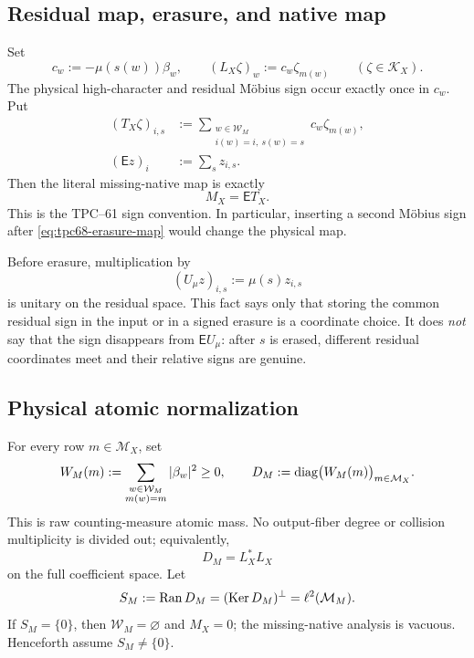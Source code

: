 \subsection{Residual map, erasure, and native map}

Set
\begin{equation}
 c_w:=-\mu(s(w))\beta_w,
 \qquad
 (L_X\zeta)_w:=c_w\zeta_{m(w)}
 \qquad(\zeta\in\mathcal K_X).
 \label{eq:tpc68-atomic-lift}
\end{equation}
The physical high-character and residual M\"obius sign occur exactly once
in \(c_w\).  Put
\begin{align}
 (T_X\zeta)_{i,s}
 &:=
 \sum_{\substack{w\in\mathcal W_M\\
                 i(w)=i,\ s(w)=s}}
 c_w\zeta_{m(w)},
 \label{eq:tpc68-residual-map}\\
 (\mathsf Ez)_i&:=\sum_s z_{i,s}.
 \label{eq:tpc68-erasure-map}
\end{align}
Then the literal missing-native map is exactly
\begin{equation}
 \boxed{M_X=\mathsf E T_X.}
 \label{eq:tpc68-missing-native-factorization}
\end{equation}
This is the TPC--61 sign convention.  In particular, inserting a second
M\"obius sign after \eqref{eq:tpc68-erasure-map} would change the physical
map.

Before erasure, multiplication by
\[
 (U_\mu z)_{i,s}:=\mu(s)z_{i,s}
\]
is unitary on the residual space.  This fact says only that storing the
common residual sign in the input or in a signed erasure is a coordinate
choice.  It does \emph{not} say that the sign disappears from
\(\mathsf EU_\mu\): after \(s\) is erased, different residual coordinates
meet and their relative signs are genuine.

\subsection{Physical atomic normalization}

For every row \(m\in\mathcal M_X\), set
\begin{equation}
 W_M(m)
 :=
 \sum_{\substack{w\in\mathcal W_M\\m(w)=m}}|\beta_w|^2\ge0,
 \qquad
 D_M:=\operatorname{diag}\bigl(W_M(m)\bigr)_{m\in\mathcal M_X}.
 \label{eq:tpc68-row-missing-mass}
\end{equation}
This is raw counting-measure atomic mass.  No output-fiber degree or
collision multiplicity is divided out; equivalently,
\[
 D_M=L_X^*L_X
\]
on the full coefficient space.  Let
\begin{equation}
 S_M:=\operatorname{Ran} D_M=(\operatorname{Ker} D_M)^\perp
     =\ell^2(\mathcal M_M).
 \label{eq:tpc68-active-missing-range}
\end{equation}
If \(S_M=\{0\}\), then \(\mathcal W_M=\varnothing\) and \(M_X=0\); the
missing-native analysis is vacuous.  Henceforth assume
\(S_M\ne\{0\}\).

